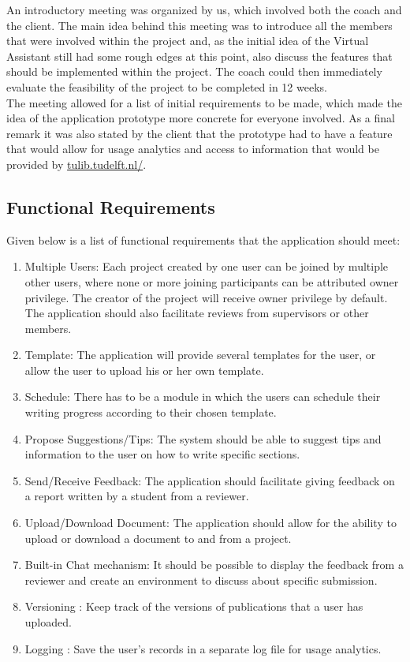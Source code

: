 An introductory meeting was organized by us, which involved both the coach and the client. The main idea behind this meeting was to introduce all the members that were involved within the project and, as the initial idea of the Virtual Assistant still had some rough edges at this point, also discuss the features that should be implemented within the project. The coach could then immediately evaluate the feasibility of the project to be completed in 12 weeks.\\
The meeting allowed for a list of initial requirements to be made, which made the idea of the application prototype more concrete for everyone involved. As a final remark it was also stated by the client that the prototype had to have a feature that would allow for usage analytics and access to information that would be provided by \url{tulib.tudelft.nl/}.\\ 



\subsection{Functional Requirements} %
\label{sub:functional_requirement}

Given below is a list of functional requirements that the application should meet:

\begin{enumerate}
	\item Multiple Users: Each project created by one user can be joined by multiple other users, where none or more joining participants can be attributed owner privilege. The creator of the project will receive owner privilege by default. The application should also facilitate reviews from supervisors or other members.
	\item Template: The application will provide several templates for the user, or allow the user to upload his or her own template.
	\item Schedule: There has to be a module in which the users can schedule their writing progress according to their chosen template.
	\item Propose Suggestions/Tips: The system should be able to suggest tips and information to the user on how to write specific sections.
	\item Send/Receive Feedback: The application should facilitate giving feedback on a report written by a student from a reviewer.
	\item Upload/Download Document: The application should allow for the ability to upload or download a document to and from a project.
	\item Built-in Chat mechanism: It should be possible to display the feedback from a reviewer and create an environment to discuss about specific submission. 
	\item Versioning : Keep track of the versions of publications that a user has uploaded.
	\item Logging : Save the user's records in a separate log file for usage analytics.
\end{enumerate}

